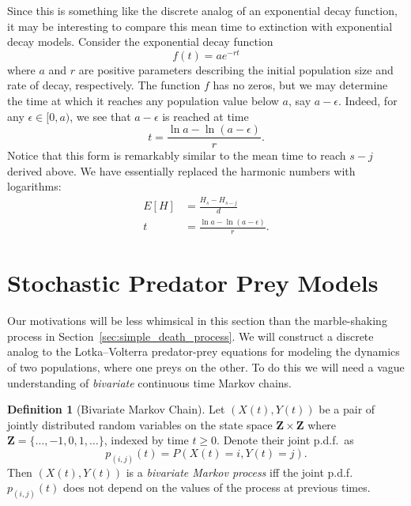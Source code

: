 \documentclass[12pt]{article}
\theoremstyle{definition}
\newtheorem{defn}{Definition}
\begin{document}
Since this is something like the discrete analog of an exponential decay
function, it may be interesting to compare this mean time to extinction with
exponential decay models. Consider the exponential decay function $$f(t) = a
e^{-rt}$$ where $a$ and $r$ are positive parameters describing the initial
population size and rate of decay, respectively. The function $f$ has no zeros,
but we may determine the time at which it reaches any population value below
$a$, say $a - \epsilon$. Indeed, for any $\epsilon \in [0, a)$, we see that $a
- \epsilon$ is reached at time $$t = \frac{\ln{a} - \ln(a - \epsilon)}{r}.$$
Notice that this form is remarkably similar to the mean time to reach $s - j$
derived above. We have essentially replaced the harmonic numbers with
logarithms:
\begin{align*}
    E[H] &= \frac{H_s - H_{s - j}}{d} \\
    t &= \frac{\ln{a} - \ln(a - \epsilon)}{r}.
\end{align*}

\section{Stochastic Predator Prey Models}
\label{sec:stochastic_predator_prey}

Our motivations will be less whimsical in this section than the marble-shaking
process in Section~\ref{sec:simple_death_process}. We will construct a discrete
analog to the Lotka--Volterra predator-prey equations for modeling the dynamics
of two populations, where one preys on the other. To do this we will need a
vague understanding of \emph{bivariate} continuous time Markov chains.

\begin{defn}[Bivariate Markov Chain]
    \label{defn:bivariate-process}
    Let $(X(t), Y(t))$ be a pair of jointly distributed random variables on the
    state space $\mathbf{Z} \times \mathbf{Z}$ where $\mathbf{Z} = \{\dots, -1,
    0, 1, \dots\}$, indexed by time $t \geq 0$.
    Denote their joint p.d.f.~as $$p_{(i, j)}(t) = P(X(t) = i, Y(t) = j).$$
    Then $(X(t), Y(t))$ is a \emph{bivariate Markov process} iff the joint
    p.d.f.~$p_{(i, j)}(t)$ does not depend on the values of the process at
    previous times.
\end{defn}
\end{document}
